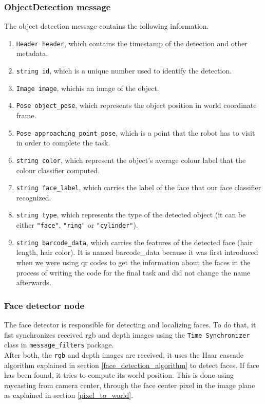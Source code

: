 \documentclass[12pt,a4paper]{article}
\begin{document}
	\subsubsection{ObjectDetection message}
	The object detection message contains the following information.
	\begin{enumerate}
		\item \texttt{Header header}, which contains the timestamp of the detection and other metadata.
		\item \texttt{string id}, which is a unique number used to identify the detection.
		\item \texttt{Image image}, whichis an image of the object.
		\item \texttt{Pose object\_pose}, which represents the object position in world coordinate frame.
		\item \texttt{Pose approaching\_point\_pose}, which is a point that the robot has to visit in order to complete the task.
		\item \texttt{string color}, which represent the object's average colour label that the colour classifier computed.
		\item \texttt{string face\_label}, which carries the label of the face that our face classifier recognized.
		\item \texttt{string type}, which represents the type of the detected object (it can be either \texttt{"face"}, \texttt{"ring"} or \texttt{"cylinder"}).
		\item \texttt{string barcode\_data}, which carries the features of the detected face (hair length, hair color). It is named barcode\_data because it was first introduced when we were using qr codes to get the information about the faces in the process of writing the code for the final task and did not change the name afterwards.
	\end{enumerate}
	
	\subsubsection{Face detector node}
	The face detector is responsible for detecting and localizing faces. To do that, it fist synchronizes received rgb and depth images using the \texttt{Time Synchronizer} class in \texttt{message\_filters} package. \\

	After both, the \texttt{rgb} and depth images are received, it uses the Haar cascade algorithm explained in section \ref{face_detection_algorithm} to detect faces. If face has been found, it tries to compute its world position. This is done using raycasting from camera center, through the face center pixel in the image plane as explained in section \ref{pixel_to_world}. \\
\end{document}
